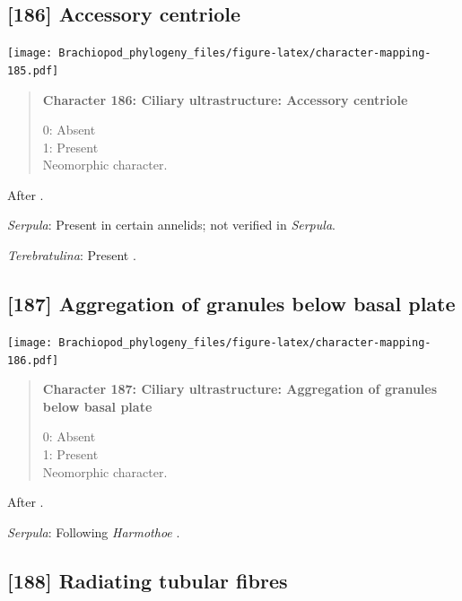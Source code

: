 \documentclass[openany]{book}
\begin{document}
\subsection*{{[}186{]} Accessory centriole}\label{accessory-centriole}

\texttt{[image: Brachiopod\_phylogeny\_files/figure-latex/character-mapping-185.pdf]}

\begin{quote}
\textbf{Character 186: Ciliary ultrastructure: Accessory centriole}

0: Absent\\
1: Present\\
Neomorphic character.
\end{quote}

After \citet{Lundin2009}.

\hypertarget{Serpula-coding-186}{}
\emph{Serpula}: Present in certain annelids; not verified in
\emph{Serpula}.

\hypertarget{Terebratulina-coding-186}{}
\emph{Terebratulina}: Present \citep{Luter1995}.

\subsection*{{[}187{]} Aggregation of granules below basal
plate}\label{aggregation-of-granules-below-basal-plate}

\texttt{[image: Brachiopod\_phylogeny\_files/figure-latex/character-mapping-186.pdf]}

\begin{quote}
\textbf{Character 187: Ciliary ultrastructure: Aggregation of granules
below basal plate}

0: Absent\\
1: Present\\
Neomorphic character.
\end{quote}

After \citet{Lundin2009}.

\hypertarget{Serpula-coding-187}{}
\emph{Serpula}: Following \emph{Harmothoe} \citep{Holborow1969}.

\subsection*{{[}188{]} Radiating tubular
fibres}\label{radiating-tubular-fibres}
\end{document}
